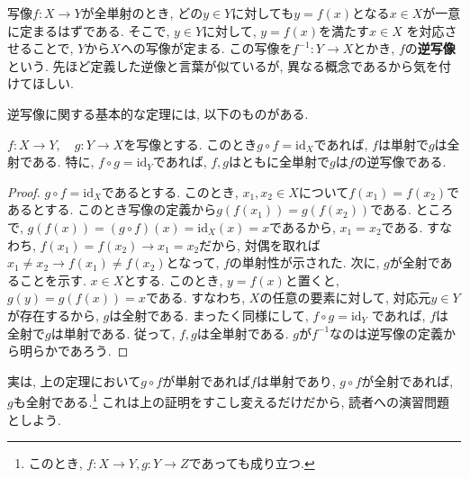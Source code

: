         写像$f:X\rightarrow Y$が全単射のとき, どの$y\in Y$に対しても$y=f(x)$となる$x\in X$が一意に定まるはずである. そこで, $y\in Y$に対して, $y=f(x)$を満たす$x\in X$
        を対応させることで, $Y$から$X$への写像が定まる. この写像を$f^{-1}:Y\rightarrow X$とかき, $f$の\textbf{逆写像}という. 先ほど定義した逆像と言葉が似ているが, 異なる概念であるから気を付けてほしい.

        逆写像に関する基本的な定理には, 以下のものがある.
        \begin{screen}
            $f:X\rightarrow Y,\quad g:Y\rightarrow X$を写像とする. このとき$g\circ f = \mathrm{id}_X$であれば, $f$は単射で$g$は全射である.
            特に, $f\circ g = \mathrm{id}_Y$であれば, $f,g$はともに全単射で$g$は$f$の逆写像である.
        \end{screen}
        \begin{proof}
            $g\circ f=\mathrm{id}_X$であるとする. このとき, $x_1,x_2\in X$について$f(x_1)=f(x_2)$であるとする. このとき写像の定義から$g(f(x_1))=g(f(x_2))$である. 
            ところで, $g(f(x))=(g\circ f)(x)=\mathrm{id}_X(x)=x$であるから, $x_1=x_2$である. すなわち, $f(x_1)=f(x_2)\rightarrow x_1=x_2$だから, 対偶を取れば
            $x_1\neq x_2\rightarrow f(x_1)\neq f(x_2)$となって, $f$の単射性が示された. 次に, $g$が全射であることを示す. $x\in X$とする. このとき, $y=f(x)$と置くと, 
            $g(y)=g(f(x))=x$である. すなわち, $X$の任意の要素に対して, 対応元$y\in Y$が存在するから, $g$は全射である. まったく同様にして, $f\circ g= \mathrm{id}_Y$
            であれば, $f$は全射で$g$は単射である. 従って, $f,g$は全単射である. $g$が$f^{-1}$なのは逆写像の定義から明らかであろう.
        \end{proof}
        実は, 上の定理において$g\circ f$が単射であれば$f$は単射であり, $g\circ f$が全射であれば, $g$も全射である.\footnote{このとき, $f:X\rightarrow Y,g:Y\rightarrow Z$であっても成り立つ.} これは上の証明をすこし変えるだけだから, 読者への演習問題としよう.\\

